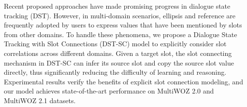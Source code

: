 Recent proposed approaches have made promising progress in dialogue state tracking (DST). However, in multi-domain scenarios, ellipsis and reference are frequently adopted by users to express values that have been mentioned by slots from other domains. To handle these phenomena, we propose a Dialogue State Tracking with Slot Connections (DST-SC) model to explicitly consider slot correlations across different domains. Given a target slot, the slot connecting mechanism in DST-SC can infer its source slot and copy the source slot value directly, thus significantly reducing the difficulty of learning and reasoning. Experimental results verify the benefits of explicit slot connection modeling, and our model achieves state-of-the-art performance on MultiWOZ 2.0 and MultiWOZ 2.1 datasets.
